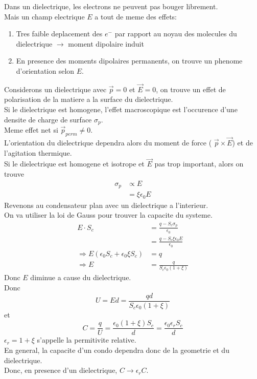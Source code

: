 \documentclass[../main.tex]{subfiles}
\begin{document}
Dans un dielectrique, les electrons ne peuvent pas bouger librement.\\
Mais un champ electrique $E$ a tout de meme des effets:
\begin{enumerate}
\item Tres faible deplacement des $e^{-}$ par rapport au noyau des molecules du dielectrique $\to$ moment dipolaire induit
\item En presence des moments dipolaires permanents, on trouve un phenome d'orientation selon $E$.
\end{enumerate}
Considerons un dielectrique avec $\vec{p}=0$ et $\vec{E}=0$, on trouve un effet de polarisation de la matiere a la surface du dielectrique.\\
Si le dielectrique est homogene, l'effet macroscopique est l'occurence d'une densite de charge de surface $\sigma_p$.\\
Meme effet net si $\vec{p}_{perm} \neq 0$.\\
L'orientation du dielectrique dependra alors du moment de force  (  $\vec{p} \times \vec{E}$) et de l'agitation thermique.\\
Si le dielectrique est homogene et isotrope et $\vec{E}$ pas trop important, alors on trouve
\begin{align*}
	\sigma_{p} &\propto E\\
		   &= \xi \epsilon_0 E
\end{align*}
Revenons au condensateur plan avec un dielectrique a l'interieur.\\
On va utiliser la loi de Gauss pour trouver la capacite du systeme.\\
\begin{align*}
	E \cdot S_c &= \frac{q -S_c \sigma_p}{ \epsilon_0}\\
	&= \frac{q- S_c \xi \epsilon_0 E}{\epsilon_0}\\
	\Rightarrow E ( \epsilon_0S_c + \epsilon_0 \xi S_c) &=q\\
	\Rightarrow E &= \frac{q}{S_c \epsilon_0 ( 1+ \xi) }
\end{align*}
Donc $E$ diminue a cause du dielectrique.\\
Donc
\[ 
	U = E d = \frac{qd}{S_c \epsilon_0 ( 1+ \xi) }
\]
et
\[ 
	C = \frac{q}{U} = \frac{\epsilon_0 ( 1+ \xi ) S_c}{d} = \frac{\epsilon_0 \epsilon_r S_c}{d}
\]
$\epsilon_r = 1+ \xi$ s'appelle la permitivite relative.\\
En general, la capacite d'un condo dependra donc de la geometrie et du dielectrique.\\
Donc, en presence d'un dielectrique, $C \to \epsilon_r C$.\\
\end{document}

